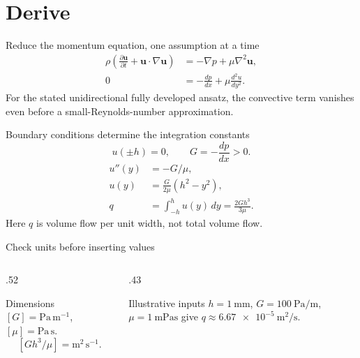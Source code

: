 \documentclass[11pt,aspectratio=169]{beamer}
\begin{document}
\section{Derive}
\begin{frame}{Reduce the momentum equation, one assumption at a time}
\begin{align*}
 \rho\left(\frac{\partial\mathbf{u}}{\partial t}+\mathbf{u}\cdot\nabla\mathbf{u}\right)
 &=-\nabla p+\mu\nabla^2\mathbf{u},\\
 0&=-\frac{dp}{dx}+\mu\frac{d^2u}{dy^2}.
\end{align*}
For the stated unidirectional fully developed ansatz, the convective term vanishes even before a small-Reynolds-number approximation.
\end{frame}
\begin{frame}{Boundary conditions determine the integration constants}
\[
 u(\pm h)=0,\qquad G=-\frac{dp}{dx}>0.
\]
\begin{align*}
 u''(y)&=-G/\mu,\\
 u(y)&=\frac{G}{2\mu}(h^2-y^2),\\
 q&=\int_{-h}^{h}u(y)\,dy=\frac{2Gh^3}{3\mu}.
\end{align*}
Here $q$ is volume flow per unit width, not total volume flow.
\end{frame}
\begin{frame}{Check units before inserting values}
\begin{columns}[T]
\begin{column}{.52\textwidth}
\begin{block}{Dimensions}
$[G]=\mathrm{Pa\,m^{-1}}$, $[\mu]=\mathrm{Pa\,s}$.
\[
 [Gh^3/\mu]=\mathrm{m^2\,s^{-1}}.
\]
\end{block}
\end{column}
\begin{column}{.43\textwidth}
\begin{exampleblock}{Illustrative inputs}
$h=\SI{1}{\milli\metre}$, $G=\SI{100}{\pascal\per\metre}$,
$\mu=\SI{1}{\milli\pascal\second}$ give
$q\approx\SI{6.67e-5}{\metre\squared\per\second}$.
\end{exampleblock}
\end{column}
\end{columns}
\end{frame}
\end{document}

